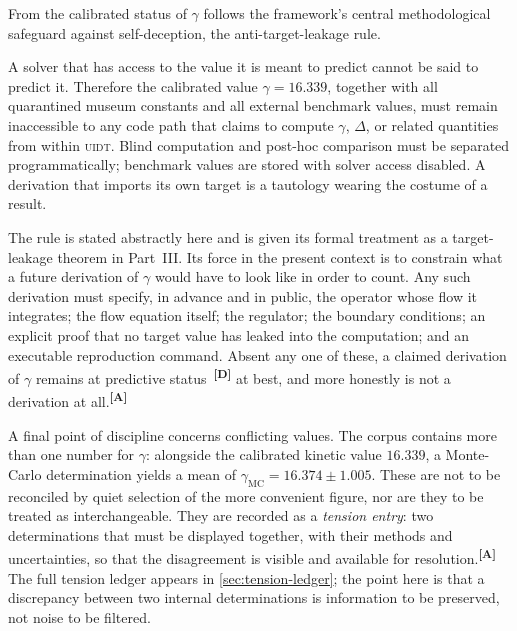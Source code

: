 \documentclass[12pt,a4paper,twoside]{article}
\theoremstyle{plain}
\theoremstyle{definition}
\theoremstyle{remark}
\newcommand{\UIDT}{\textsc{uidt}}
\newcommand{\catmark}[1]{\textsuperscript{\textsf{\textbf{[#1]}}}}
\newcommand{\GammaMC}{16.374 \pm 1.005} %
\begin{document}
From the calibrated status of $\gamma$ follows the framework's central methodological safeguard against self-deception, the anti-target-leakage rule.

\begin{governancebox}
A solver that has access to the value it is meant to predict cannot be said to predict it. Therefore the calibrated value $\gamma = 16.339$, together with all quarantined museum constants and all external benchmark values, must remain inaccessible to any code path that claims to compute $\gamma$, $\Delta$, or related quantities from within \UIDT. Blind computation and post-hoc comparison must be separated programmatically; benchmark values are stored with solver access disabled. A derivation that imports its own target is a tautology wearing the costume of a result.
\end{governancebox}

\noindent The rule is stated abstractly here and is given its formal treatment as a target-leakage theorem in Part~III. Its force in the present context is to constrain what a future derivation of $\gamma$ would have to look like in order to count. Any such derivation must specify, in advance and in public, the operator whose flow it integrates; the flow equation itself; the regulator; the boundary conditions; an explicit proof that no target value has leaked into the computation; and an executable reproduction command. Absent any one of these, a claimed derivation of $\gamma$ remains at predictive status~\catmark{D} at best, and more honestly is not a derivation at all.\catmark{A}

A final point of discipline concerns conflicting values. The corpus contains more than one number for $\gamma$: alongside the calibrated kinetic value $16.339$, a Monte-Carlo determination yields a mean of $\gamma_{\mathrm{MC}} = \GammaMC$. These are not to be reconciled by quiet selection of the more convenient figure, nor are they to be treated as interchangeable. They are recorded as a \emph{tension entry}: two determinations that must be displayed together, with their methods and uncertainties, so that the disagreement is visible and available for resolution.\catmark{A} The full tension ledger appears in \cref{sec:tension-ledger}; the point here is that a discrepancy between two internal determinations is information to be preserved, not noise to be filtered.
\end{document}
